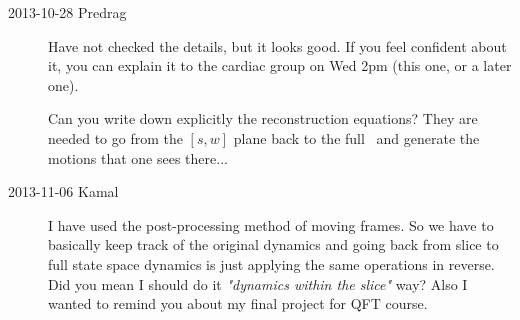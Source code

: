 \begin{description}
\item[2013-10-28 Predrag] Have not checked the details, but it looks
good. If you feel confident about it, you can explain it to the
cardiac group on Wed 2pm (this one, or a later one).

Can you write down explicitly the
{reconstruction equations}? They are needed to go from the $[s,w]$ plane
back to the full \statesp\ and generate the motions that one sees
there...

\item[2013-11-06 Kamal] I have used the post-processing method of moving frames. So we have to basically keep track of the original dynamics and going back from slice to full state space dynamics is just applying the same operations in reverse. Did you mean I should do it \emph{"dynamics within the slice"} way? Also I wanted to remind you about my final project for QFT course.

\end{description}
\renewcommand{\ssp}{a}

